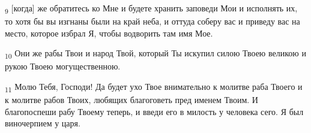 \begin{tcolorbox}
\textsubscript{9} [когда] же обратитесь ко Мне и будете хранить заповеди Мои и исполнять их, то хотя бы вы изгнаны были на край неба, и оттуда соберу вас и приведу вас на место, которое избрал Я, чтобы водворить там имя Мое.
\end{tcolorbox}
\begin{tcolorbox}
\textsubscript{10} Они же рабы Твои и народ Твой, который Ты искупил силою Твоею великою и рукою Твоею могущественною.
\end{tcolorbox}
\begin{tcolorbox}
\textsubscript{11} Молю Тебя, Господи! Да будет ухо Твое внимательно к молитве раба Твоего и к молитве рабов Твоих, любящих благоговеть пред именем Твоим. И благопоспеши рабу Твоему теперь, и введи его в милость у человека сего. Я был виночерпием у царя.
\end{tcolorbox}
